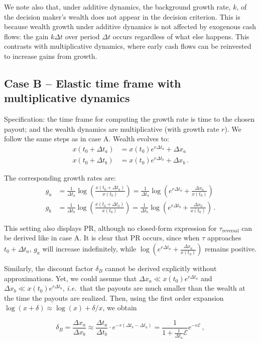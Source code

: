 \documentclass[11pt]{article}
\newcommand{\ie}{{\it i.e.}\ }
\newcommand{\be}{\begin{equation}}
\newcommand{\ee}{\end{equation}}
\newcommand{\bea}{\begin{eqnarray}}
\newcommand{\eea}{\end{eqnarray}}
\newcommand{\Dt}{\Delta t}
\newcommand{\Dx}{\Delta x}
\newcommand{\Epsilon}{\mathcal{E}}
\numberwithin{equation}{section}
\begin{document}
We note also that, under additive dynamics, the background growth rate, $k$, of the decision maker's wealth does not appear in the decision criterion. This is because wealth growth under additive dynamics is not affected by exogenous cash flows: the gain $k\Dt$ over period $\Dt$ occurs regardless of what else happens. This contrasts with multiplicative dynamics, where early cash flows can be reinvested to increase gains from growth.

\subsection{Case B -- Elastic time frame with multiplicative dynamics}\label{sec:case_B}

Specification: the time frame for computing the growth rate is time to the chosen payout; and the wealth dynamics are multiplicative (with growth rate $r$). We follow the same steps as in case A. Wealth evolves to:
\bea
x\left(t_0+\Dt_a\right) &= x\left(t_0\right) e^{r \Dt_a} + \Dx_a\\
x\left(t_0+\Dt_b\right) &= x\left(t_0\right) e^{r \Dt_b} + \Dx_b\,.
\eea

The corresponding growth rates are:
\bea
g_a &= \frac{1}{\Dt_a} \log{\left(\frac{x\left(t_0+\Dt_a\right)}{x\left(t_0\right)}\right)} = \frac{1}{\Dt_a}\log{\left(e^{r \Dt_a} + \frac{\Dx_a}{x\left(t_0\right)}\right)}\\
g_b &= \frac{1}{\Dt_b} \log{\left(\frac{x\left(t_0+\Dt_b\right)}{x\left(t_0\right)}\right)} = \frac{1}{\Dt_b}\log{\left(e^{r \Dt_b} + \frac{\Dx_b}{x\left(t_0\right)}\right)}\,.
\eea

This setting also displays PR, although no closed-form expression for $\tau_{\text{reversal}}$ can be derived like in case A. It is clear that PR occurs, since when $\tau$ approaches $t_0+\Dt_a$, $g_a$ will increase indefinitely, while $\log{\left(e^{r \Dt_a} + \frac{\Dx_a}{x\left(t_0\right)}\right)}$ remains positive.

Similarly, the discount factor $\delta_B$ cannot be derived explicitly without approximations. Yet, we could assume that $\Dx_a \ll x\left(t_0\right)e^{r \Dt_a}$ and $\Dx_b \ll x\left(t_0\right)e^{r \Dt_b}$, \ie that the payouts are much smaller than the wealth at the time the payouts are realized. Then, using the first order expansion $\log\left(x+\delta\right) \approx \log\left(x\right) + \delta/x$, we obtain

\be
\delta_B = \frac{\Dx_a}{\Dx_b} \approx \frac{\Dt_a}{\Dt_b} \cdot e^{-r \left(\Dt_b - \Dt_a\right)} = \frac{1}{1+\frac{1}{\Dt_a} \Epsilon}e^{-r\Epsilon}\,,
\ee
\end{document}
